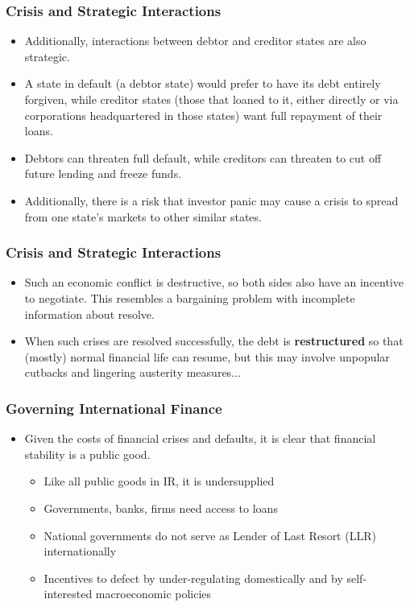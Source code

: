 \documentclass[handout]{beamer}
\begin{document}
\begin{frame} 
	\frametitle{\LARGE{Crisis and Strategic Interactions}}
	\begin{itemize}
		\item Additionally, interactions between debtor and creditor states are also strategic. \pause
		\item A state in default (a debtor state) would prefer to have its debt entirely forgiven, while creditor states (those that loaned to it, either directly or via corporations headquartered in those states) want full repayment of their loans. \pause
		\item Debtors can threaten full default, while creditors can threaten to cut off future lending and freeze funds. \pause
		\item Additionally, there is a risk that investor panic may cause a crisis to spread from one state's markets to other similar states.
	\end{itemize}
\end{frame}

\begin{frame} 
	\frametitle{\LARGE{Crisis and Strategic Interactions}}
	\begin{itemize}
		\item Such an economic conflict is destructive, so both sides also have an incentive to negotiate. This resembles a bargaining problem with incomplete information about resolve.
		\item When such crises are resolved successfully, the debt is \textbf{restructured} so that (mostly) normal financial life can resume, but this may involve unpopular cutbacks and lingering austerity measures...
	\end{itemize}
\end{frame}

\begin{frame} 
	\frametitle{\LARGE{Governing International Finance}}
	\begin{itemize}
			\item Given the costs of financial crises and defaults, it is clear that financial stability is a public good. \pause 
			\begin{itemize}
			    \item Like all public goods in IR, it is undersupplied \pause 
                \item Governments, banks, firms need access to loans \pause 
                \item National governments do not serve as Lender of Last Resort (LLR) internationally \pause 
                \item Incentives to defect by under-regulating domestically and by self-interested macroeconomic policies  
			\end{itemize}
	\end{itemize}
\end{frame}
\end{document}
